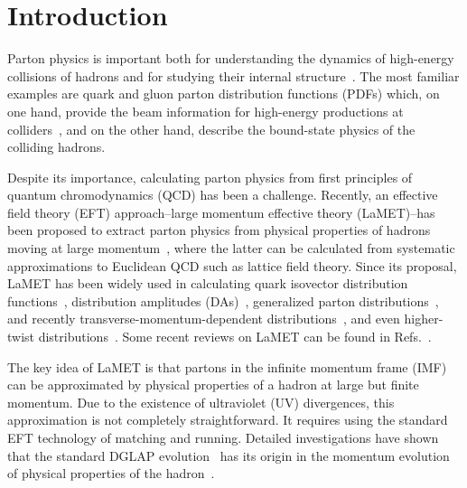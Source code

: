 \documentclass[preprint,12pt]{elsarticle}
\begin{document}

\section{Introduction}
\label{sec:intro}

Parton physics is important both for understanding the dynamics of
high-energy collisions of hadrons and for studying their
internal structure~\cite{Ellis:1991qj,Thomas:2001kw}. The most familiar examples
are quark and gluon parton distribution functions (PDFs)
which, on one hand, provide the beam information for
high-energy productions at colliders~\cite{Gao:2017yyd}, and on the other hand,
describe the bound-state physics of the colliding hadrons.

Despite its importance, calculating parton physics from first principles of
quantum chromodynamics (QCD) has been a challenge. Recently,
an effective field theory (EFT) approach--large momentum effective theory (LaMET)--has been proposed to extract parton physics from physical properties
of hadrons moving at large momentum~\cite{Ji:2013dva,Ji:2014gla}, where the latter
can be calculated from systematic approximations to Euclidean QCD such
as lattice field theory. Since its proposal, LaMET has been widely used in calculating quark isovector distribution functions~\cite{Lin:2014zya,Alexandrou:2015rja,Chen:2016utp,Alexandrou:2016jqi,Alexandrou:2018pbm,Chen:2018xof,Lin:2018qky,Liu:2018uuj,Alexandrou:2018eet,Liu:2018hxv,Chen:2018fwa,Izubuchi:2019lyk,Shugert:2020tgq,Chai:2020nxw,Lin:2020ssv,Fan:2020nzz}, distribution amplitudes (DAs)~\cite{Zhang:2017bzy,Chen:2017gck,Zhang:2020gaj},
generalized parton distributions~\cite{Chen:2019lcm,Alexandrou:2019dax}, and recently transverse-momentum-dependent
distributions~\cite{Shanahan:2019zcq,Shanahan:2020zxr,Zhang:2020dbb}, and even higher-twist distributions~\cite{Bhattacharya:2020cen}. Some recent reviews on
LaMET can be found in Refs.~\cite{Ji:2020ect,Cichy:2018mum}.

The key idea of LaMET is that partons in the infinite momentum frame (IMF)
can be approximated by physical properties of a hadron at large but
finite momentum. Due to the existence of ultraviolet (UV) divergences, this approximation
is not completely straightforward. It requires using the standard EFT technology of matching and running. Detailed investigations have shown that the standard DGLAP evolution~\cite{Dokshitzer:1977sg,Gribov:1972ri,Altarelli:1977zs} has its origin in the momentum evolution of physical properties of the hadron~\cite{Ji:2020ect}.
\end{document}

